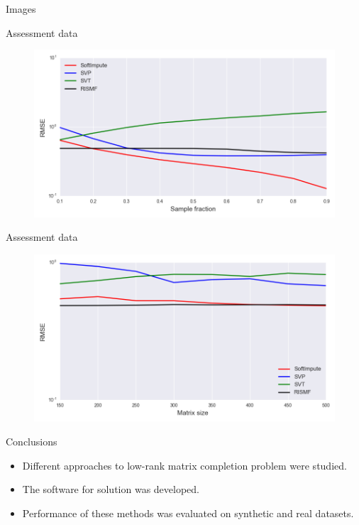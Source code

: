 \documentclass{beamer}
\begin{document}
\begin{frame}{Images}
\begin{multicols}{3}
\begin{figure}[h]
		\end{figure}
	\end{multicols}
\end{frame}
\begin{frame}{Assessment data}
	\begin{figure}[h]
		\centering
		\includegraphics[width=\linewidth]{./../results/real/exper_1/real_nsamp_rmse.png}
	\end{figure}
\end{frame}
\begin{frame}{Assessment data}
	\begin{figure}[h]
		\centering
		\includegraphics[width=\linewidth]{./../results/real/exper_3/real_size_rmse.png}
	\end{figure}
\end{frame}
\begin{frame}{Conclusions}
	\begin{itemize}
		\item Different approaches to low-rank matrix completion problem were studied.
		\vspace{0.3cm}
		\item The software for solution was developed.
		\vspace{0.3cm}
		\item Performance of these methods was evaluated on synthetic and real datasets.
	\end{itemize}
\end{frame}
\end{document}
